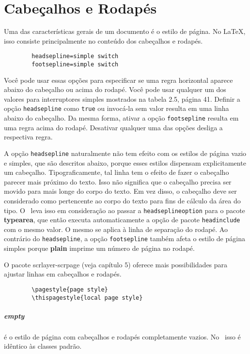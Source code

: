 \chapter{Cabeçalhos e Rodapés}

Uma das características gerais de um documento é o estilo de página. No \LaTeX, isso consiste principalmente no conteúdo dos cabeçalhos e rodapés.
\begin{verbatim}
        headsepline=simple switch
        footsepline=simple switch
\end{verbatim}

Você pode usar essas opções para especificar se uma regra horizontal aparece abaixo do cabeçalho ou acima do rodapé. Você pode usar qualquer um dos valores para interruptores simples mostrados na tabela 2.5, página 41. Definir a opção \texttt{headsepline} como \texttt{true} ou invocá-la sem valor resulta em uma linha abaixo do cabeçalho. Da mesma forma, ativar a opção \texttt{footsepline} resulta em uma regra acima do rodapé. Desativar qualquer uma das opções desliga a respectiva regra.

A opção \texttt{headsepline} naturalmente não tem efeito com os estilos de página vazio e simples, que são descritos abaixo, porque esses estilos dispensam explicitamente um cabeçalho. Tipograficamente, tal linha tem o efeito de fazer o cabeçalho parecer mais próximo do texto. Isso não significa que o cabeçalho precisa ser movido para mais longe do corpo do texto. Em vez disso, o cabeçalho deve ser considerado como pertencente ao corpo do texto para fins de cálculo da área do tipo. O \KOMAScript\ leva isso em consideração ao passar a \texttt{head\-sep\-li\-ne\-op\-tion} para o pacote \textbf{typearea}, que então executa automaticamente a opção de pacote \texttt{headinclude} com o mesmo valor. O mesmo se aplica à linha de separação do rodapé. Ao contrário do \texttt{headsepline}, a opção \texttt{footsepline} também afeta o estilo de página simples porque \textbf{plain} imprime um número de página no rodapé.

O pacote scrlayer-scrpage (veja capítulo 5) oferece mais possibilidades para ajustar linhas em cabeçalhos e rodapés.
\begin{verbatim}
        \pagestyle{page style}
        \thispagestyle{local page style}
\end{verbatim}

\paragraph{empty} é o estilo de página com cabeçalhos e rodapés completamente vazios. No \KOMAScript\ isso é idêntico às classes padrão.

